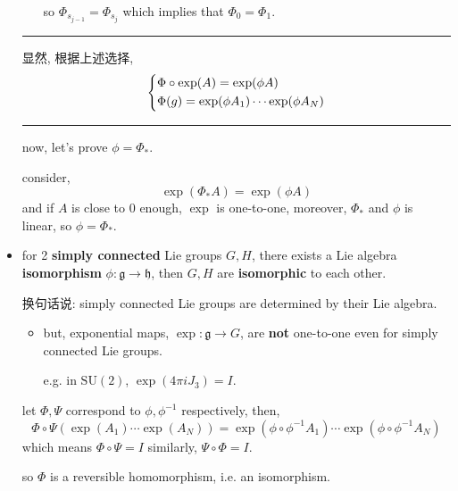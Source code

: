 \begin{itemize}
\begin{tcolorbox}[title=proof:]
\begin{itemize}
			so $\Phi_{s_{j - 1}} = \Phi_{s_j}$ which implies that $\Phi_0 = \Phi_1$.
		\end{itemize}
		
		\noindent\rule[0.5ex]{\linewidth}{0.5pt} %
		
		显然, 根据上述选择,
		\begin{equation}
			\begin{dcases}
				\Phi \circ \exp(A) = \exp(\phi A) \\
				\Phi(g) = \exp(\phi A_1) \cdots \exp(\phi A_N)
			\end{dcases}
		\end{equation}
		
		\noindent\rule[0.5ex]{\linewidth}{0.5pt} %
		
		now, let's prove $\phi = \Phi_*$.
		
		consider,
		\begin{equation}
			\exp(\Phi_* A) = \exp(\phi A)
		\end{equation}
		and if $A$ is close to $0$ enough, $\exp$ is one-to-one, moreover, $\Phi_*$ and $\phi$ is linear, so $\phi = \Phi_*$.
	\end{tcolorbox}
	
	\item for 2 \textbf{simply connected} Lie groups $G, H$, there exists a Lie algebra \textbf{isomorphism} $\phi : \mathfrak{g} \rightarrow \mathfrak{h}$, then $G, H$ are \textbf{isomorphic} to each other.
	
	换句话说: simply connected Lie groups are determined by their Lie algebra.
	\begin{itemize}
		\item but, exponential maps, $\exp : \mathfrak{g} \rightarrow G$, are \textbf{not} one-to-one even for simply connected Lie groups.
		
		e.g. in $\mathrm{SU}(2)$, $\exp(4 \pi i J_3) = I$.
	\end{itemize}
	
	\begin{tcolorbox}[title=proof:]
		let $\Phi, \Psi$ correspond to $\phi, \phi^{- 1}$ respectively, then,
		\begin{equation}
			\Phi \circ \Psi(\exp(A_1) \cdots \exp(A_N)) = \exp(\phi \circ \phi^{- 1} A_1) \cdots \exp(\phi \circ \phi^{- 1} A_N)
		\end{equation}
		which means $\Phi \circ \Psi = I$ similarly, $\Psi \circ \Phi = I$.
		
		so $\Phi$ is a reversible homomorphism, i.e. an isomorphism.
	\end{tcolorbox}
	

\end{itemize}
